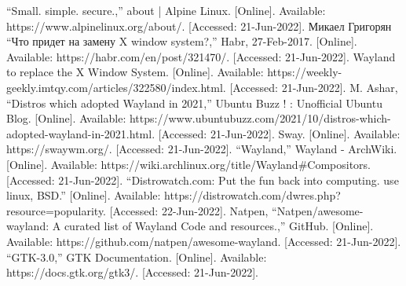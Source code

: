 \documentclass[conference]{IEEEtran}
\begin{document}
\begin{thebibliography}{00}
 “Small. simple. secure.,” about | Alpine Linux. [Online]. Available: https://www.alpinelinux.org/about/. [Accessed: 21-Jun-2022]. 
 Микаел Григорян “Что придет на замену X window system?,” Habr, 27-Feb-2017. [Online]. Available: https://habr.com/en/post/321470/. [Accessed: 21-Jun-2022].  
 Wayland to replace the X Window System. [Online]. Available: https://weekly-geekly.imtqy.com/articles/322580/index.html. [Accessed: 21-Jun-2022]. 
 M. Ashar, “Distros which adopted Wayland in 2021,” Ubuntu Buzz ! : Unofficial Ubuntu Blog. [Online]. Available: https://www.ubuntubuzz.com/2021/10/distros-which-adopted-wayland-in-2021.html. [Accessed: 21-Jun-2022]. 
 Sway. [Online]. Available: https://swaywm.org/. [Accessed: 21-Jun-2022]. 
 “Wayland,” Wayland - ArchWiki. [Online]. Available: https://wiki.archlinux.org/title/Wayland#Compositors. [Accessed: 21-Jun-2022].  
 “Distrowatch.com: Put the fun back into computing. use linux, BSD.” [Online]. Available: https://distrowatch.com/dwres.php?resource=popularity. [Accessed: 22-Jun-2022]. 
 Natpen, “Natpen/awesome-wayland: A curated list of Wayland Code and resources.,” GitHub. [Online]. Available: https://github.com/natpen/awesome-wayland. [Accessed: 21-Jun-2022]. 
 “GTK-3.0,” GTK Documentation. [Online]. Available: https://docs.gtk.org/gtk3/. [Accessed: 21-Jun-2022]. 
\end{thebibliography}
\vspace{12pt}
\end{document}
